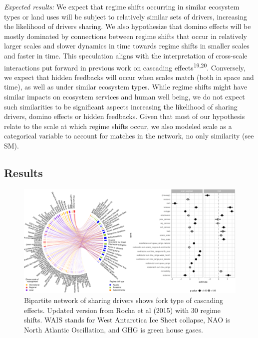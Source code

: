 \documentclass[9pt,]{article}
\begin{document}
\emph{Expected results:} We expect that regime shifts occurring in
similar ecosystem types or land uses will be subject to relatively
similar sets of drivers, increasing the likelihood of drivers sharing.
We also hypothesize that domino effects will be mostly dominated by
connections between regime shifts that occur in relatively larger scales
and slower dynamics in time towards regime shifts in smaller scales and
faster in time. This speculation aligns with the interpretation of
cross-scale interactions put forward in previous work on cascading
effects\textsuperscript{19,20}. Conversely, we expect that hidden
feedbacks will occur when scales match (both in space and time), as well
as under similar ecosystem types. While regime shifts might have similar
impacts on ecosystem services and human well being, we do not expect
such similarities to be significant aspects increasing the likelihood of
sharing drivers, domino effects or hidden feedbacks. Given that most of
our hypothesis relate to the scale at which regime shifts occur, we also
modeled scale as a categorical variable to account for matches in the
network, no only similarity (see SM).

\subsection{Results}\label{results}

\begin{figure}

{\centering \includegraphics{170417_draft_files/figure-latex/Fig3-1} 

}

\caption{Bipartite network of sharing drivers shows fork type of cascading effects. Updated version from Rocha et al (2015) with 30 regime shifts. WAIS stands for West Antarctica Ice Sheet collapse, NAO is North Atlantic Oscillation, and GHG is green house gases.}\label{fig:Fig3}
\end{figure}
\end{document}
